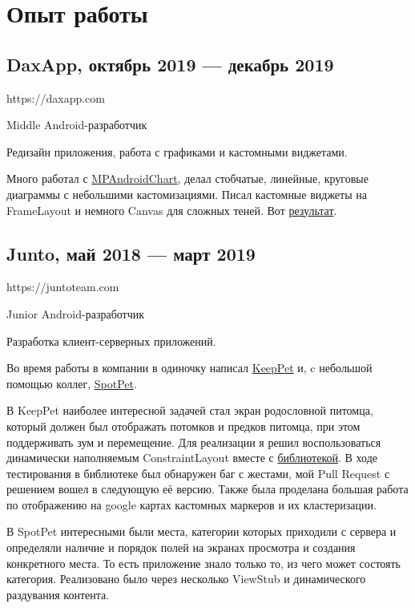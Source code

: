 \documentclass[a4paper,12pt]{article}
\begin{document}
    \section*{Опыт работы}

    \subsection*{DaxApp, октябрь 2019 --- декабрь 2019}

    https://daxapp.com\par
    Middle Android-разработчик\par
    Редизайн приложения, работа с графиками и кастомными виджетами.

    Много работал с \href{https://github.com/PhilJay/MPAndroidChart}{MPAndroidChart}, делал стобчатые, линейные, круговые диаграммы с небольшими кастомизациями. Писал кастомные виджеты на FrameLayout и немного Canvas для сложных теней. Вот \href{https://play.google.com/store/apps/details?id=com.juntoteam.spotpet}{результат}.
    
    \subsection*{Junto, май 2018 --- март 2019}
    
    https://juntoteam.com\par
    Junior Android-разработчик\par
    Разработка клиент-серверных приложений.\par
    
    Во время работы в компании в одиночку написал \href{https://play.google.com/store/apps/details?id=com.juntoteam.keeppet}{KeepPet} и, c небольшой помощью коллег, \href{https://play.google.com/store/apps/details?id=com.juntoteam.spotpet}{SpotPet}. 
    
    В KeepPet наиболее интересной задачей стал экран родословной питомца, который должен был отображать потомков и предков питомца, при этом поддерживать зум и перемещение. Для реализации я решил воспользоваться динамически наполняемым ConstraintLayout вместе с \href{https://github.com/natario1/ZoomLayout}{библиотекой}. В ходе тестирования в библиотеке был обнаружен баг с жестами, мой Pull Request с решением вошел в следующую её версию. Также была проделана большая работа по отображению на google картах  кастомных маркеров и их кластеризации.
    
    В SpotPet интересными были места, категории которых приходили с сервера и определяли наличие и порядок полей на экранах просмотра и создания конкретного места. То есть приложение знало только то, из чего может состоять категория. Реализовано было через несколько ViewStub и динамического раздувания контента.
\end{document}
